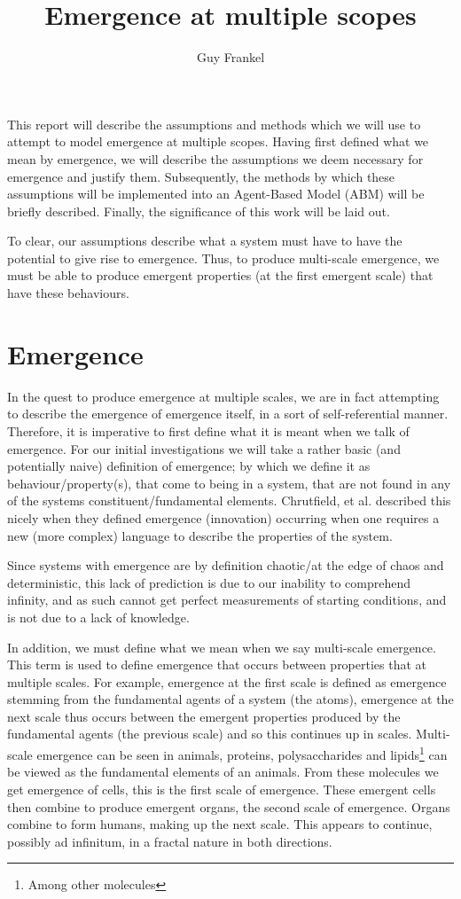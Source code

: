 \documentclass{article}
\title{Emergence at multiple scopes}
\author{Guy Frankel}
\date{}
\begin{document}
\maketitle
\vspace{-6mm}


This report will describe the assumptions and methods which we will use to attempt to model emergence at multiple scopes. Having first defined what we mean by emergence, we will describe the assumptions we deem necessary for emergence and justify them. Subsequently, the methods by which these assumptions will be implemented into an Agent-Based Model (ABM) will be briefly described. Finally, the significance of this work will be laid out.

To clear, our assumptions describe what a system must have to have the potential to give rise to emergence. Thus, to produce multi-scale emergence, we must be able to produce emergent properties (at the first emergent scale) that have these behaviours.


\section{Emergence}

In the quest to produce emergence at multiple scales, we are in fact attempting to describe the emergence of emergence itself, in a sort of self-referential manner. Therefore, it is imperative to first define what it is meant when we talk of emergence. For our initial investigations we will take a rather basic (and potentially naive) definition of emergence; by which we define it as behaviour/property(s), that come to being in a system, that are not found in any of the systems constituent/fundamental elements. Chrutfield, et al. described this nicely when they defined emergence (innovation) occurring when one requires a new (more complex) language to describe the properties of the system. 

  Since systems with emergence are by definition chaotic/at the edge of chaos and deterministic, this lack of prediction is due to our inability to comprehend infinity, and as such cannot get perfect measurements of starting conditions, and is not due to a lack of knowledge.

  In addition, we must define what we mean when we say multi-scale emergence. This term is used to define emergence that occurs between properties that at multiple scales. For example, emergence at the first scale is defined as emergence stemming from the fundamental agents of a system (the atoms), emergence at the next scale thus occurs between the emergent properties produced by the fundamental agents (the previous scale) and so this continues up in scales. Multi-scale emergence can be seen in animals, proteins, polysaccharides and lipids\footnote{Among other molecules} can be viewed as the fundamental elements of an animals. From these molecules we get emergence of cells, this is the first scale of emergence. These emergent cells then combine to produce emergent organs, the second scale of emergence. Organs combine to form humans, making up the next scale. This appears to continue, possibly ad infinitum, in a fractal nature in both directions. 
\end{document}
